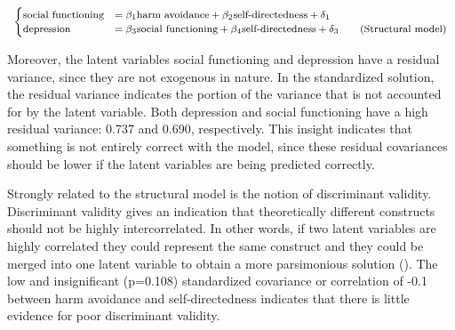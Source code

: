 \documentclass[11pt]{article}
\begin{document}
\begin{table}[h]
\begin{equation}
\footnotesize
  \begin{cases}
    \textrm{social functioning} & = \beta_1 \textrm{harm avoidance} + \beta_2 \textrm{self-directedness} + \delta_1 \\
    \textrm{depression} & = \beta_3 \textrm{social functioning} + \beta_4 \textrm{self-directedness} + \delta_3
    \tag{Structural model}
  \end{cases}
\end{equation}
\captionsetup{singlelinecheck=off}
\caption{Structural model}
\label{tab:base_structural}
\end{table}

Moreover, the latent variables social functioning and depression have a residual
variance, since they are not exogenous in nature. In the standardized solution,
the residual variance indicates the portion of the variance that is not accounted
for by the latent variable. Both depression and social functioning have a high
residual variance: 0.737 and 0.690, respectively. This insight indicates that
something is not entirely correct with the model, since these residual covariances
should be lower if the latent variables are being predicted correctly.

Strongly related to the structural model is the notion of discriminant validity.
Discriminant validity gives an indication that theoretically different constructs
should not be highly intercorrelated. In other words, if two latent variables
are highly correlated they could represent the same construct and they could be
merged into one latent variable to obtain a more parsimonious solution
(\cite{brown2015}). The low and insignificant (p=0.108) standardized covariance
or correlation of -0.1 between harm avoidance and self-directedness indicates
that there is little evidence for poor discriminant validity.
\end{document}

